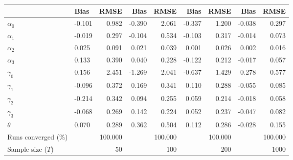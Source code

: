 
\begin{tabular}[t]{llrrrrrrr}
\toprule
  & Bias & RMSE & Bias & RMSE & Bias & RMSE & Bias & RMSE\\
\midrule
$\alpha_{0}$ & -0.101 & 0.982 & -0.390 & 2.061 & -0.337 & 1.200 & -0.038 & 0.297\\
$\alpha_{1}$ & -0.019 & 0.297 & -0.104 & 0.534 & -0.103 & 0.317 & -0.014 & 0.073\\
$\alpha_{2}$ & 0.025 & 0.091 & 0.021 & 0.039 & 0.001 & 0.026 & 0.002 & 0.016\\
$\alpha_{3}$ & 0.133 & 0.390 & 0.040 & 0.228 & -0.122 & 0.212 & -0.017 & 0.057\\
$\gamma_{0}$ & 0.156 & 2.451 & -1.269 & 2.041 & -0.637 & 1.429 & 0.278 & 0.577\\
$\gamma_{1}$ & -0.096 & 0.372 & 0.169 & 0.341 & 0.110 & 0.288 & -0.055 & 0.085\\
$\gamma_{2}$ & -0.214 & 0.342 & 0.094 & 0.255 & 0.059 & 0.214 & -0.018 & 0.058\\
$\gamma_{3}$ & -0.068 & 0.269 & 0.142 & 0.224 & 0.052 & 0.237 & -0.047 & 0.082\\
$\theta$ & 0.070 & 0.289 & 0.362 & 0.504 & 0.112 & 0.286 & -0.028 & 0.155\\
Runs converged (\%) &  & 100.000 &  & 100.000 &  & 100.000 &  & 100.000\\
Sample size ($T$) &  & 50 &  & 100 &  & 200 &  & 1000\\
\bottomrule
\end{tabular}
